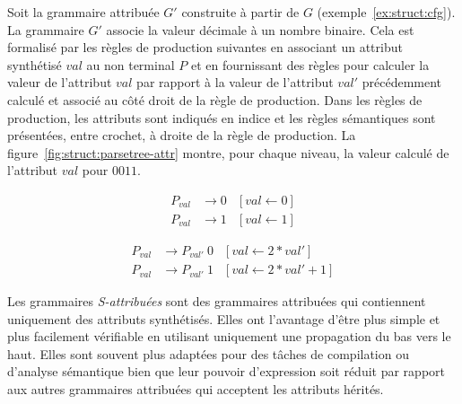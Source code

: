 \begin{example}
    \label{ex:struct:cfg-attr}
    Soit la grammaire attribuée $G'$ construite à partir de $G$ (exemple~\ref{ex:struct:cfg}).
    La grammaire $G'$ associe la valeur décimale à un nombre binaire.
    Cela est formalisé par les règles de production suivantes en associant un attribut synthétisé $val$ au non terminal $P$ et en fournissant des règles pour calculer la valeur de l'attribut $val$ par rapport à la valeur de l'attribut $val'$ précédemment calculé et associé au côté droit de la règle de production.
    Dans les règles de production, les attributs sont indiqués en indice et les règles sémantiques sont présentées, entre crochet, à droite de la règle de production.
    La figure~\ref{fig:struct:parsetree-attr} montre, pour chaque niveau, la valeur calculé de l'attribut $val$ pour $0011$.
    \begin{minipage}[b]{.45\textwidth}
        \begin{align*}
            P_{val} & \to 0 & [val \gets 0] \\
            P_{val} & \to 1 & [val \gets 1]
        \end{align*}
    \end{minipage}
    \quad
    \begin{minipage}[b]{.45\textwidth}
        \begin{align*}
            P_{val} & \to P_{val'}~0 & [val \gets 2 * val'] \\
            P_{val} & \to P_{val'}~1 & [val \gets 2 * val' + 1]
        \end{align*}
    \end{minipage}
\end{example}

Les grammaires \emph{S-attribuées} sont des grammaires attribuées qui contiennent uniquement des attributs synthétisés.
Elles ont l'avantage d'être plus simple et plus facilement vérifiable en utilisant uniquement une propagation du bas vers le haut.
Elles sont souvent plus adaptées pour des tâches de compilation ou d'analyse sémantique bien que leur pouvoir d'expression soit réduit par rapport aux autres grammaires attribuées qui acceptent les attributs hérités.


